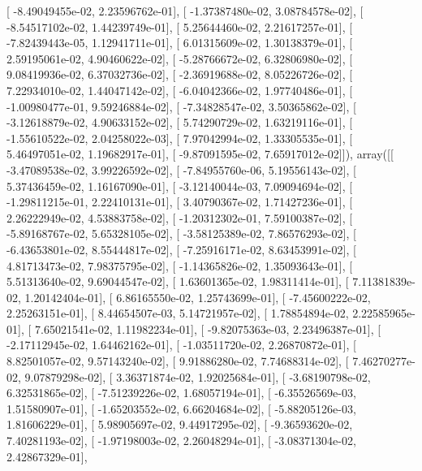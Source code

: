 \documentclass{article}
\begin{document}
       [ -8.49049455e-02,   2.23596762e-01],
       [ -1.37387480e-02,   3.08784578e-02],
       [ -8.54517102e-02,   1.44239749e-01],
       [  5.25644460e-02,   2.21617257e-01],
       [ -7.82439443e-05,   1.12941711e-01],
       [  6.01315609e-02,   1.30138379e-01],
       [  2.59195061e-02,   4.90460622e-02],
       [ -5.28766672e-02,   6.32806980e-02],
       [  9.08419936e-02,   6.37032736e-02],
       [ -2.36919688e-02,   8.05226726e-02],
       [  7.22934010e-02,   1.44047142e-02],
       [ -6.04042366e-02,   1.97740486e-01],
       [ -1.00980477e-01,   9.59246884e-02],
       [ -7.34828547e-02,   3.50365862e-02],
       [ -3.12618879e-02,   4.90633152e-02],
       [  5.74290729e-02,   1.63219116e-01],
       [ -1.55610522e-02,   2.04258022e-03],
       [  7.97042994e-02,   1.33305535e-01],
       [  5.46497051e-02,   1.19682917e-01],
       [ -9.87091595e-02,   7.65917012e-02]]), array([[ -3.47089538e-02,   3.99226592e-02],
       [ -7.84955760e-06,   5.19556143e-02],
       [  5.37436459e-02,   1.16167090e-01],
       [ -3.12140044e-03,   7.09094694e-02],
       [ -1.29811215e-01,   2.22410131e-01],
       [  3.40790367e-02,   1.71427236e-01],
       [  2.26222949e-02,   4.53883758e-02],
       [ -1.20312302e-01,   7.59100387e-02],
       [ -5.89168767e-02,   5.65328105e-02],
       [ -3.58125389e-02,   7.86576293e-02],
       [ -6.43653801e-02,   8.55444817e-02],
       [ -7.25916171e-02,   8.63453991e-02],
       [  4.81713473e-02,   7.98375795e-02],
       [ -1.14365826e-02,   1.35093643e-01],
       [  5.51313640e-02,   9.69044547e-02],
       [  1.63601365e-02,   1.98311414e-01],
       [  7.11381839e-02,   1.20142404e-01],
       [  6.86165550e-02,   1.25743699e-01],
       [ -7.45600222e-02,   2.25263151e-01],
       [  8.44654507e-03,   5.14721957e-02],
       [  1.78854894e-02,   2.22585965e-01],
       [  7.65021541e-02,   1.11982234e-01],
       [ -9.82075363e-03,   2.23496387e-01],
       [ -2.17112945e-02,   1.64462162e-01],
       [ -1.03511720e-02,   2.26870872e-01],
       [  8.82501057e-02,   9.57143240e-02],
       [  9.91886280e-02,   7.74688314e-02],
       [  7.46270277e-02,   9.07879298e-02],
       [  3.36371874e-02,   1.92025684e-01],
       [ -3.68190798e-02,   6.32531865e-02],
       [ -7.51239226e-02,   1.68057194e-01],
       [ -6.35526569e-03,   1.51580907e-01],
       [ -1.65203552e-02,   6.66204684e-02],
       [ -5.88205126e-03,   1.81606229e-01],
       [  5.98905697e-02,   9.44917295e-02],
       [ -9.36593620e-02,   7.40281193e-02],
       [ -1.97198003e-02,   2.26048294e-01],
       [ -3.08371304e-02,   2.42867329e-01],
\end{document}
